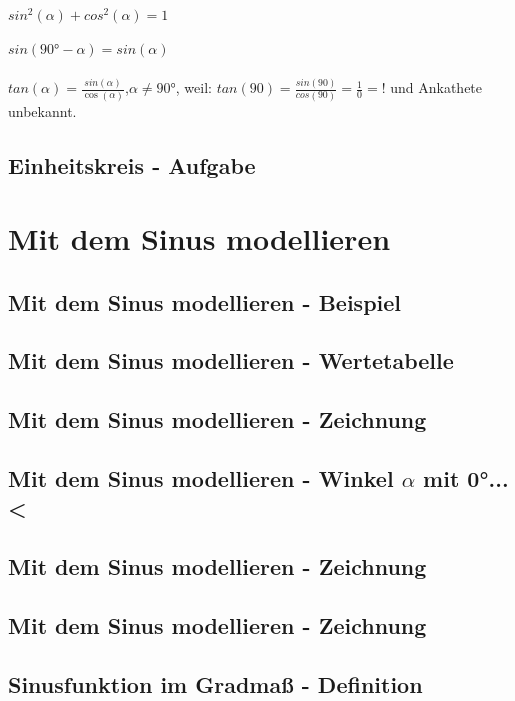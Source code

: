 \documentclass[12pt,a4paper]{article}
\begin{document}
\paragraph{}
$sin^2(\alpha) + cos^2(\alpha) = 1$
\paragraph{}
$sin(90° - \alpha) = sin(\alpha)$
\paragraph{}
$tan(\alpha) = \frac{sin(\alpha)}{\cos(\alpha)}$,$\alpha \neq 90°$, weil: 
$tan(90)=\frac{sin(90)}{cos(90)} = \frac{1}{0} = !$ und Ankathete unbekannt.
\subsection{Einheitskreis - Aufgabe}


\section{Mit dem Sinus modellieren}
\subsection{Mit dem Sinus modellieren - Beispiel}
\subsection{Mit dem Sinus modellieren - Wertetabelle}
\subsection{Mit dem Sinus modellieren - Zeichnung}

\subsection{Mit dem Sinus modellieren - Winkel $\alpha$ mit 0°...<}
\subsection{Mit dem Sinus modellieren - Zeichnung}
\subsection{Mit dem Sinus modellieren - Zeichnung}

\subsection{Sinusfunktion im Gradmaß - Definition}
\end{document}
